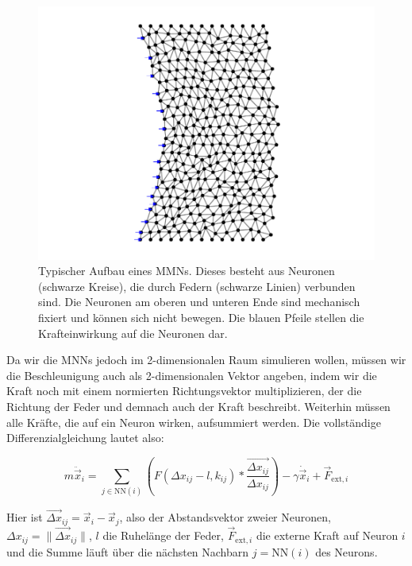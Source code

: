\begin{figure}[h!]
    \centering
    \includegraphics[trim=0cm 0.8cm 0cm 0.8cm, clip]{bilder/test4.pdf}
    \caption{Typischer Aufbau eines MMNs. Dieses besteht aus Neuronen (schwarze Kreise), die durch Federn (schwarze Linien) verbunden sind. Die Neuronen am oberen und unteren Ende sind mechanisch fixiert und können sich nicht bewegen.
    Die blauen Pfeile stellen die Krafteinwirkung auf die Neuronen dar.
    }
    \label{fig:positive_springs}
\end{figure}

Da wir die MNNs jedoch im 2-dimensionalen Raum simulieren wollen, müssen wir die Beschleunigung auch als 2-dimensionalen Vektor angeben, indem wir die Kraft noch mit einem normierten Richtungsvektor multiplizieren, der die Richtung der Feder und demnach auch der Kraft beschreibt. 
Weiterhin müssen alle Kräfte, die auf ein Neuron wirken, aufsummiert werden.
Die vollständige Differenzialgleichung lautet also:

{\[
    m \ddot{\vec{x}}_{i} = \sum_{j \in \textrm{NN}(i)} \left( F\left(\Delta x_{ij} - l, k_{ij}\right)
     * \frac{\vec{\Delta x_{ij}}}{ \Delta x_{ij}} \right)
     - \gamma \dot{\vec{x}}_i + \vec{F}_{\textrm{ext}, i}
\]}

Hier ist $ \vec{\Delta x}_{ij} = \vec{x}_i - \vec{x}_j$, also der Abstandsvektor zweier Neuronen,
$\Delta x_{ij}= \| \vec{\Delta x}_{ij} \|$, $l$ die Ruhelänge der Feder, 
$\vec{F}_{\textrm{ext}, i}$ die externe Kraft auf Neuron $i$ und die Summe läuft über die nächsten Nachbarn $j = \textrm{NN}(i)$ des Neurons. 

